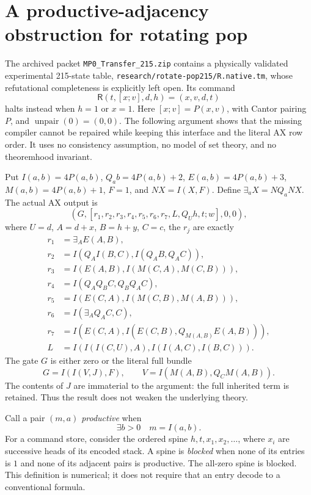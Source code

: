 \section{A productive-adjacency obstruction for rotating pop}
\label{sec:rotating-obstruction}

The archived packet \texttt{MP0\_Transfer\_215.zip} contains a physically
validated experimental 215-state table, \texttt{research/rotate-pop215/R.native.tm},
whose refutational completeness is explicitly left open. Its command
\[
 \mathsf R(t,[x;v],d,h)=(x,v,d,t)
\]
halts instead when $h=1$ or $x=1$. Here $[x;v]=P(x,v)$, with Cantor
pairing $P$, and $\operatorname{unpair}(0)=(0,0)$. The following argument
shows that the missing compiler cannot be repaired while keeping this
interface and the literal AX row order. It uses no consistency assumption,
no model of set theory, and no theoremhood invariant.

Put $I(a,b)=4P(a,b)$, $Q_a b=4P(a,b)+2$, $E(a,b)=4P(a,b)+3$,
$M(a,b)=4P(a,b)+1$, $F=1$, and $NX=I(X,F)$. Define
$\exists_aX=NQ_aNX$. The actual AX output is
\[
 (G,[r_1,r_2,r_3,r_4,r_5,r_6,r_7,L,Q_Uh,t;w],0,0),
\]
where $U=d$, $A=d+x$, $B=h+y$, $C=c$, the $r_j$ are exactly
\begin{align*}
 r_1&=\exists_AE(A,B),\\
 r_2&=I(Q_A I(B,C),I(Q_AB,Q_AC)),\\
 r_3&=I(E(A,B),I(M(C,A),M(C,B))),\\
 r_4&=I(Q_AQ_BC,Q_BQ_AC),\\
 r_5&=I(E(C,A),I(M(C,B),M(A,B))),\\
 r_6&=I(\exists_AQ_AC,C),\\
 r_7&=I(E(C,A),I(E(C,B),Q_{M(A,B)}E(A,B))),\\
 L&=I(I(I(C,U),A),I(I(A,C),I(B,C))).
\end{align*}
The gate $G$ is either zero or the literal full bundle
\[
 G=I(I(V,J),F),\qquad V=I(M(A,B),Q_CM(A,B)).
\]
The contents of $J$ are immaterial to the argument: the full inherited
term is retained. Thus the result does not weaken the underlying theory.

Call a pair $(m,a)$ \emph{productive} when
\[
             \exists b>0\quad m=I(a,b).
\]
For a command store, consider the ordered spine
$h,t,x_1,x_2,\ldots$, where $x_i$ are successive heads of its encoded
stack. A spine is \emph{blocked} when none of its entries is $1$ and
none of its adjacent pairs is productive. The all-zero spine is blocked.
This definition is numerical; it does not require that an entry decode
to a conventional formula.

